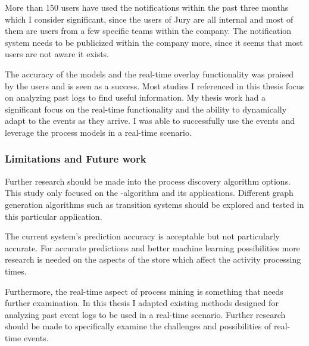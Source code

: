 More than 150 users have used the notifications within the past three months which I consider significant, 
since the users of Jury are all internal and most of them are users from a few specific teams within the company.
The notification system needs to be publicized within the company more, since it seems that most users are not aware it exists.

The accuracy of the models and the real-time overlay functionality was praised by the users and is seen as a success.
Most studies I referenced in this thesis focus on analyzing past logs to find useful information.
My thesis work had a significant focus on the real-time functionality and the ability to dynamically adapt to the events as they arrive.
I was able to successfully use the events and leverage the process models in a real-time scenario.

\subsubsection{Limitations and Future work}

Further research should be made into the process discovery algorithm options.
This study only focused on the \textalpha-algorithm and its applications. 
Different graph generation algorithms such as transition systems \cite{van2013discovering} should be explored and tested in this particular application.

The current system's prediction accuracy is acceptable but not particularly accurate.
For accurate predictions and better machine learning possibilities more research is needed on the aspects of the store which affect the activity processing times.

Furthermore, the real-time aspect of process mining is something that needs further examination. In this thesis I adapted existing methods designed for analyzing past event logs to be used in a real-time scenario.
Further research should be made to specifically examine the challenges and possibilities of real-time events.

